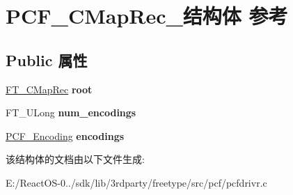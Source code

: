 \hypertarget{struct_p_c_f___c_map_rec__}{}\section{P\+C\+F\+\_\+\+C\+Map\+Rec\+\_\+结构体 参考}
\label{struct_p_c_f___c_map_rec__}
\subsection*{Public 属性}
\begin{DoxyCompactItemize}
\item 
\mbox{\label{struct_p_c_f___c_map_rec___aa3ad854a757574253179a70833a9846a}} 
\hyperlink{struct_f_t___c_map_rec__}{F\+T\+\_\+\+C\+Map\+Rec} {\bfseries root}
\item 
\mbox{\label{struct_p_c_f___c_map_rec___a208fa462668d783f45cfc18d942c73f4}} 
F\+T\+\_\+\+U\+Long {\bfseries num\+\_\+encodings}
\item 
\mbox{\label{struct_p_c_f___c_map_rec___aa7ac931b4d2793f5c3082fdc188af6b2}} 
\hyperlink{struct_p_c_f___encoding_rec__}{P\+C\+F\+\_\+\+Encoding} {\bfseries encodings}
\end{DoxyCompactItemize}


该结构体的文档由以下文件生成\+:\begin{DoxyCompactItemize}
\item 
E\+:/\+React\+O\+S-\/0../sdk/lib/3rdparty/freetype/src/pcf/pcfdrivr.\+c\end{DoxyCompactItemize}
